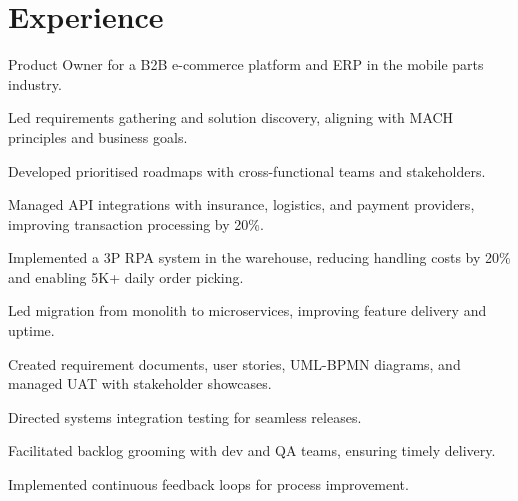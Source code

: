 \documentclass[]{deedy-resume-reversed}
\begin{document}
%
%


%
%

\begin{minipage}[t]{0.60\textwidth}



\section{Experience}

\vspace{\topsep}
\begin{tightemize}
\item Product Owner for a B2B e-commerce platform and ERP in the mobile parts industry.
\item Led requirements gathering and solution discovery, aligning with MACH principles and business goals.
\item Developed prioritised roadmaps with cross-functional teams and stakeholders.
\item Managed API integrations with insurance, logistics, and payment providers, improving transaction processing by 20\%.
\item Implemented a 3P RPA system in the warehouse, reducing handling costs by 20\% and enabling 5K+ daily order picking.
\item Led migration from monolith to microservices, improving feature delivery and uptime.
\item Created requirement documents, user stories, UML-BPMN diagrams, and managed UAT with stakeholder showcases.
\item Directed systems integration testing for seamless releases.
\item Facilitated backlog grooming with dev and QA teams, ensuring timely delivery.
\item Implemented continuous feedback loops for process improvement.
\end{tightemize}
\sectionsep


\end{minipage}
\end{document}

